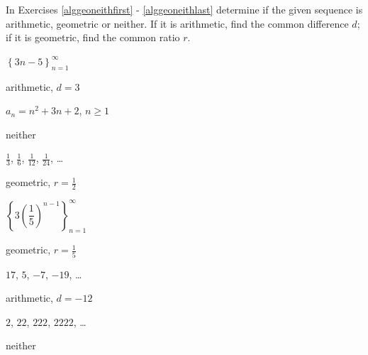 \documentclass{ximera}
\begin{document}
\begin{question}
    In Exercises \ref{alggeoneithfirst} - \ref{alggeoneithlast} determine if the given sequence is arithmetic, geometric or neither.  If it is arithmetic, find the common difference $d$; if it is geometric, find the common ratio $r$.

\begin{problem}\label{alggeoneithfirst}
    $\left\{ 3n-5 \right\}_{n=1}^{\infty}$

\begin{solution}
     arithmetic, $d = 3$
\end{solution}
\end{problem}


 \begin{problem}
     $a_{n} = n^2+3n+2$, $n \geq 1$

     \begin{solution}
         neither
     \end{solution}
 \end{problem}

 \begin{problem}
     $\frac{1}{3}$, $\frac{1}{6}$, $\frac{1}{12}$, $\frac{1}{24}$, \ldots

     \begin{solution}
         geometric, $r = \frac{1}{2}$
     \end{solution}
 \end{problem}

 \begin{problem}
     $\left\{ 3 \left(\dfrac{1}{5}\right)^{n-1} \right\}_{n=1}^{\infty}$

     \begin{solution}
         geometric, $r = \frac{1}{5}$
     \end{solution}
 \end{problem}

 \begin{problem}
      $17$, $5$, $-7$, $-19$, \ldots

      \begin{solution}
          arithmetic, $d = -12$
      \end{solution}
 \end{problem}

 \begin{problem}
     $2$, $22$, $222$, $2222$, \ldots

     \begin{solution}
         neither
     \end{solution}
 \end{problem}


\end{question}
\end{document}
